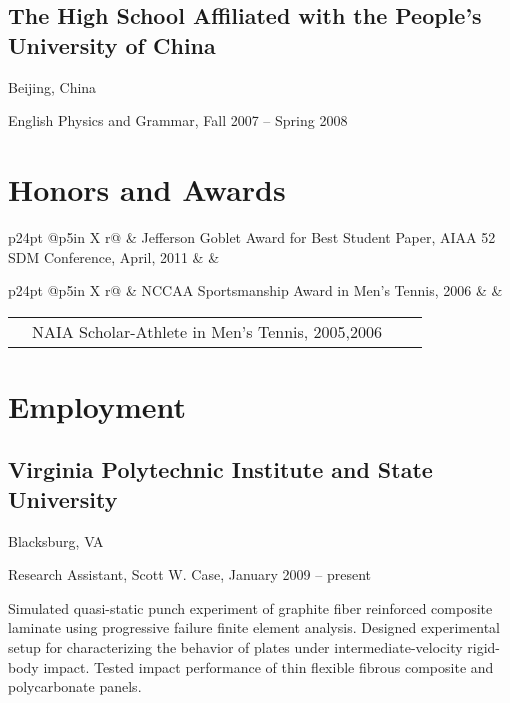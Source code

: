 \documentclass[10pt,letterpaper]{article}
\makeatletter
\def\vpisu{Virginia Polytechnic Institute and State University}
\renewenvironment{itemize}{
  \begin{list}{}{
    \setlength{\leftmargin}{30pt}
    \setlength{\itemsep}{0.2em}
    \setlength{\parskip}{0pt}
    \setlength{\parsep}{0.25em}
  }
}{
  \end{list}
}
\newcommand{\rowtabular}[4][3.7in]{%
  \begin{tabularx}{\linewidth}{p{24pt} @{}p{#1} X r@{}}%
    & #2 & #3 & #4 \\ [1.0pt]%
  \end{tabularx}%
}
\renewcommand{\textsuperscript}[1]{%
  \raisebox{2.5pt}{\scriptsize \hspace{0.3pt}#1}%
}
\makeatother
\begin{document}
\subsection*{The High School Affiliated with the People's University of China}
Beijing, China

\begin{itemize}
\item English Physics and Grammar, Fall 2007 -- Spring 2008
\end{itemize}

\section*{Honors and Awards}

\rowtabular[5in]{Jefferson Goblet Award for Best Student Paper, AIAA 52\textsuperscript{nd} SDM Conference, April, 2011}{}{}
\rowtabular[5in]{NCCAA Sportsmanship Award in Men's Tennis, 2006}{}{}
\rowtabular[5in]{NAIA Scholar-Athlete in Men's Tennis, 2005,2006}{}{}

\section*{Employment}

\titleformat{\subsection}[runin]{\large \it}{}{0pt}{}[\hfill\ ]

\subsection*{\vpisu}
Blacksburg, VA

\begin{itemize}
\item Research Assistant, Scott W. Case, January 2009 -- present
  \begin{itemize}
  \item Simulated quasi-static punch experiment of graphite fiber reinforced
    composite laminate using progressive failure finite element analysis.
    Designed experimental setup for characterizing the behavior of plates under
    intermediate-velocity rigid-body impact.  Tested impact performance of thin
    flexible fibrous composite and polycarbonate panels.
  \end{itemize}
\end{itemize}
\end{document}
